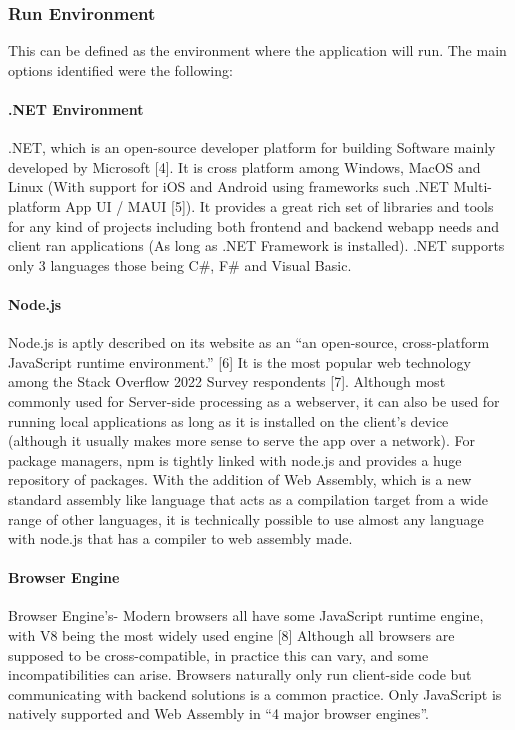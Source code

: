 \subsubsection{Run Environment}
This can be defined as the environment where the application will run. The main options identified were the following:

\paragraph{.NET Environment}
.NET, which is an open-source developer platform for building Software mainly developed by Microsoft [4]. It is cross platform among Windows, MacOS and Linux (With support for iOS and Android using frameworks such .NET Multi-platform App UI / MAUI [5]). It provides a great rich set of libraries and tools for any kind of projects including both frontend and backend webapp needs and client ran applications (As long as .NET Framework is installed). .NET supports only 3 languages those being C\#, F\# and Visual Basic.

\paragraph{Node.js}
Node.js is aptly described on its website as an “an open-source, cross-platform JavaScript runtime environment.” [6] It is the most popular web technology among the Stack Overflow 2022 Survey respondents [7]. Although most commonly used for Server-side processing as a webserver, it can also be used for running local applications as long as it is installed on the client’s device (although it usually makes more sense to serve the app over a network). For package managers, npm is tightly linked with node.js and provides a huge repository of packages. With the addition of Web Assembly, which is a new standard assembly like language that acts as a compilation target from a wide range of other languages, it is technically possible to use almost any language with node.js that has a compiler to web assembly made.

\paragraph{Browser Engine}
Browser Engine’s- Modern browsers all have some JavaScript runtime engine, with V8 being the most widely used engine [8] Although all browsers are supposed to be cross-compatible, in practice this can vary, and some incompatibilities can arise. Browsers naturally only run client-side code but communicating with backend solutions is a common practice. Only JavaScript is natively supported and Web Assembly in “4 major browser engines”.

